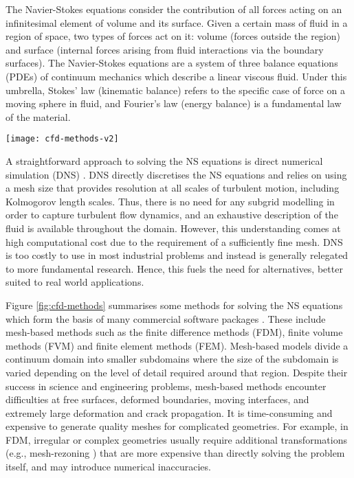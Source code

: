 \documentclass[10pt]{iopart}
\begin{document}
The Navier-Stokes equations consider the contribution of all forces acting on an infinitesimal element of volume and its surface. Given a certain mass of fluid in a region of space, two types of forces act on it: volume (forces outside the region) and surface (internal forces arising from fluid interactions via the boundary surfaces). The Navier-Stokes equations are a system of three balance equations (PDEs) of continuum mechanics which describe a linear viscous fluid. Under this umbrella, Stokes' law (kinematic balance) refers to the specific case of force on a moving sphere in fluid, and Fourier's law (energy balance) is a fundamental law of the material. 

\begin{figure*}[ht!]
\centering
\texttt{[image: cfd-methods-v2]}
\caption{Examples of numerical methods for simulating CFD problems: finite volume method (FVM), element-based finite volume method (E-FVM), finite element method (FEM), finite difference method (FDM), particle-in-cell (PIC), moving-particle semi-implicit method (MPS), particle-based FEM (P-FEM), smooth particle hydrodynamics (SPH).}
\label{fig:cfd-methods}
\end{figure*}

A straightforward approach to solving the NS equations is direct numerical simulation (DNS) \cite{Moin1998}. DNS directly discretises the NS equations and relies on using a mesh size that provides resolution at all scales of turbulent motion, including Kolmogorov length scales. Thus, there is no need for any subgrid modelling in order to capture turbulent flow dynamics, and an exhaustive description of the fluid is available throughout the domain. However, this understanding comes at high computational cost due to the requirement of a sufficiently fine mesh. DNS is too costly to use in most industrial problems and instead is generally relegated to more fundamental research. Hence, this fuels the need for alternatives, better suited to real world applications. 

Figure \ref{fig:cfd-methods} summarises some methods for solving the NS equations which form the basis of many commercial software packages \cite{Chung2002}. These include mesh-based methods such as the finite difference methods (FDM), finite volume methods (FVM) and finite element methods (FEM). Mesh-based models divide a continuum domain into smaller subdomains where the size of the subdomain is varied depending on the level of detail required around that region. 
Despite their success in science and engineering problems, mesh-based methods encounter difficulties at free surfaces, deformed boundaries, moving interfaces, and extremely large deformation and crack propagation. It is time-consuming and expensive to generate quality meshes for complicated geometries. For example, in FDM, irregular or complex geometries usually require additional transformations (e.g., mesh-rezoning \cite{Liu2003m}) that are more expensive than directly solving the problem itself, and may introduce numerical inaccuracies. 
 
\end{document}

